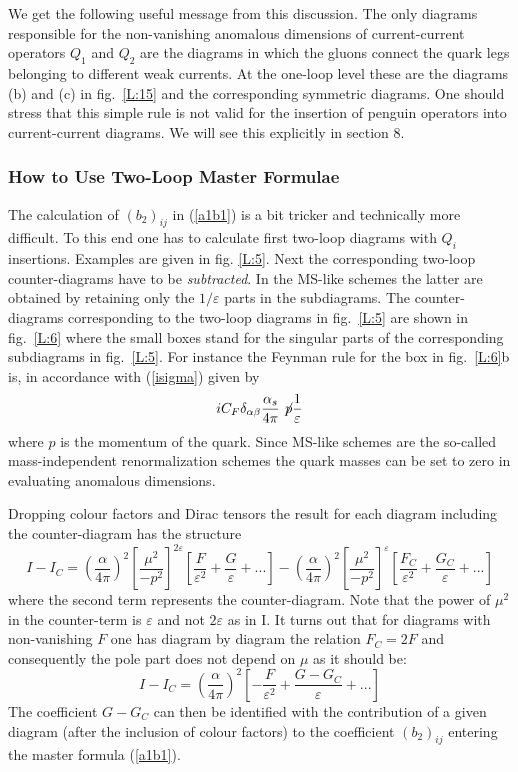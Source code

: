 \documentclass[12pt]{article}
\def\eps{\varepsilon}
\newcommand{\be}{\begin{equation}}
\newcommand{\ee}{\end{equation}}
\begin{document}
\begin{itemize}
\begin{itemize}
\begin{itemize}
We get the following useful message from this discussion. The only diagrams
responsible for the non-vanishing anomalous dimensions of current-current 
operators $Q_1$ and $Q_2$ are the diagrams in which the gluons connect the
quark legs belonging to different weak currents. At the one-loop level these
are the diagrams (b) and (c) in fig.\ \ref{L:15} and the 
corresponding symmetric diagrams. One should stress that this simple
rule is not valid for the insertion of penguin operators into
current-current diagrams. We will see this explicitly in section 8.
\subsubsection{How to Use Two-Loop Master Formulae}
The calculation of $(b_2)_{ij}$ in (\ref{a1b1}) is a bit tricker
and technically more difficult. To this end one has to calculate first
two-loop diagrams with $Q_i$ insertions. Examples are given 
in fig. \ref{L:5}.
Next the corresponding two-loop counter-diagrams have to be 
{\it subtracted}. 
In the MS-like schemes the latter are obtained by retaining
only the $1/\eps$ parts in the subdiagrams. The counter-diagrams
corresponding to the two-loop diagrams in fig.~\ref{L:5} are shown 
in fig.~\ref{L:6}
where the small boxes stand for the singular parts of 
the corresponding subdiagrams in fig.~\ref{L:5}. 
For instance the Feynman rule
for the box in fig.~\ref{L:6}b is, in accordance with (\ref{isigma})  
given by
\begin{equation}\label{sigma1}
i C_F \delta_{\alpha\beta}  
\frac{\alpha_s}{4\pi} \not\! p
 \frac{1}{\varepsilon} 
\end{equation} 
where $p$ is the momentum of the quark. Since MS-like schemes are
the so-called mass-independent renormalization schemes the quark masses
can be set to zero in evaluating anomalous dimensions. 

Dropping colour factors and Dirac tensors the result for each diagram
including the counter-diagram has the structure
\be\label{IMIC}
I-I_C=\left(\frac{\alpha}{4\pi}\right)^2
\left[\frac{\mu^2}{-p^2}\right]^{2\eps}
\left[\frac{F}{\eps^2}+\frac{G}{\eps}+...\right]
-\left(\frac{\alpha}{4\pi}\right)^2
\left[\frac{\mu^2}{-p^2}\right]^{\eps}
\left[\frac{F_C}{\eps^2}+\frac{G_C}{\eps}+...\right]
\ee
where the second term represents the counter-diagram. 
Note that the power of $\mu^2$ in the counter-term is $\varepsilon$
and not $2 \varepsilon$ as in I.
It turns out
that for diagrams with non-vanishing $F$ one has diagram by diagram
the relation $F_C=2 F$ and consequently the pole part does not depend on
$\mu$ as it should be:
\be\label{IMICA}
I-I_C=\left(\frac{\alpha}{4\pi}\right)^2
\left[-\frac{F}{\eps^2}+\frac{G-G_C}{\eps}+...\right]
\ee
The coefficient $G-G_C$ can then be identified with the contribution
of a given diagram (after the inclusion of colour factors) to the
coefficient $(b_2)_{ij}$ entering the master formula (\ref{a1b1}).



\end{itemize}
\end{itemize}
\end{itemize}
\end{document}

